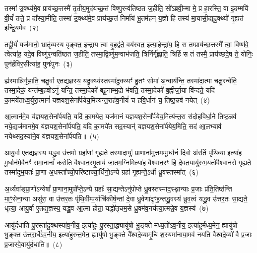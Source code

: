 तस्मा॑ उ॒क्थ्य॑मे॒व प्राय॑च्छ॒त्तस्मै॑ तृ॒तीय॒मुद॑यच्छ॒त्तं विष्णु॒रन्व॑तिष्ठत ज॒हीति॒ सो᳚\-ऽब्रवी॒न्मा मे॒ प्र हा॒रस्ति॒ वा इ॒दम्मयि॑ वी॒र्यं॑ तत्ते॒ प्र दा᳚स्या॒मीति॒ तस्मा॑ उ॒क्थ्य॑मे॒व प्राय॑च्छ॒त्तं निर्मा॑यं भू॒तम॑हन् य॒ज्ञो हि तस्य॑ मा॒यासी॒द्यदु॒क्थ्यो॑ गृ॒ह्यत॑ इन्द्रि॒यमे॒व~(२)

तद्वी॒र्यं॑ यज॑मानो॒ भ्रातृ॑व्यस्य वृङ्क्त॒ इन्द्रा॑य त्वा बृ॒हद्व॑ते॒ वय॑स्वत॒ इत्या॒हेन्द्रा॑य॒ हि स तम्प्राय॑च्छ॒त्तस्मै᳚ त्वा॒ विष्ण॑वे॒ त्वेत्या॑ह॒ यदे॒व विष्णु॑र॒न्वति॑ष्ठत ज॒हीति॒ तस्मा॒द्विष्णु॑म॒न्वाभ॑जति॒ त्रिर्निर्गृ॑ह्णाति॒ त्रिर्\mbox{}हि स तं तस्मै॒ प्राय॑च्छदे॒ष ते॒ योनिः॒ पुन॑र्\mbox{}हविर॒सीत्या॑ह॒ पुनः॑पुनः~(३)

ह्य॑स्मान्निर्गृ॒ह्णाति॒ चक्षु॒र्वा ए॒तद्य॒ज्ञस्य॒ यदु॒क्थ्य॑स्तस्मा॑दु॒क्थ्यꣳ॑ हु॒तꣳ सोमा॑ अ॒न्वाय॑न्ति॒ तस्मा॑दा॒त्मा चक्षु॒रन्वे॑ति॒ तस्मा॒देकं॒ यन्त॑म्ब॒हवो\-ऽनु॑ यन्ति॒ तस्मा॒देको॑ बहू॒नाम्भ॒द्रो भ॑वति॒ तस्मा॒देको॑ ब॒ह्वीर्जा॒या वि॑न्दते॒ यदि॑ का॒मये॑ताध्व॒र्युरा॒त्मानं॑ यज्ञयश॒सेना᳚र्पयेय॒मित्य॑न्त॒राह॑व॒नीयं॑ च हवि॒र्धानं॑ च॒ तिष्ठ॒न्नव॑ नयेत्~(४)

आ॒त्मान॑मे॒व य॑ज्ञयश॒सेना᳚र्पयति॒ यदि॑ का॒मये॑त॒ यज॑मानं यज्ञयश॒सेना᳚र्पयेय॒मित्य॑न्त॒रा स॑दोहविर्धा॒ने तिष्ठ॒न्नव॑ नये॒द्यज॑मानमे॒व य॑ज्ञयश॒सेना᳚र्पयति॒ यदि॑ का॒मये॑त सद॒स्यान्॑ यज्ञयश॒सेना᳚र्पयेय॒मिति॒ सद॑ आ॒लभ्याव॑ नयेथ्सद॒स्या॑ने॒व य॑ज्ञयश॒सेना᳚र्पयति॥~(५)

{\anuvakamend[{इती᳚न्द्रि॒यमे॒व पुनः॑पुनर्नये॒त्त्रय॑स्त्रिꣳशच्च}]}%

आयु॒र्वा ए॒तद्य॒ज्ञस्य॒ यद्ध्रु॒व उ॑त्त॒मो ग्रहा॑णां गृह्यते॒ तस्मा॒दायुः॑ प्रा॒णाना॑मुत्त॒मम्मू॒र्धानं॑ दि॒वो अ॑र॒तिं पृ॑थि॒व्या इत्या॑ह मू॒र्धान॑मे॒वैनꣳ॑ समा॒नानां᳚ करोति वैश्वान॒रमृ॒ताय॑ जा॒तम॒ग्निमित्या॑ह वैश्वान॒रꣳ हि दे॒वत॒यायु॑रुभ॒यतो॑वैश्वानरो गृह्यते॒ तस्मा॑दुभ॒यतः॑ प्रा॒णा अ॒धस्ता᳚च्चो॒परि॑ष्टाच्चा॒र्धिनो॒\-ऽन्ये ग्रहा॑ गृ॒ह्यन्ते॒\-ऽर्धी ध्रु॒वस्तस्मा᳚त्~(६)

अ॒र्ध्यवा᳚ङ्प्रा॒णो᳚\-ऽन्येषां᳚ प्रा॒णाना॒मुपो᳚प्ते॒\-ऽन्ये ग्रहाः᳚ सा॒द्यन्ते\-ऽनु॑पोप्ते ध्रु॒वस्तस्मा॑द॒स्थ्नान्याः प्र॒जाः प्र॑ति॒तिष्ठ॑न्ति मा॒ꣳ॒सेना॒न्या असु॑रा॒ वा उ॑त्तर॒तः पृ॑थि॒वीम्प॒र्याचि॑कीर्\mbox{}ष॒न्तां दे॒वा ध्रु॒वेणा॑दृꣳह॒न्तद्ध्रु॒वस्य॑ ध्रुव॒त्वं यद्ध्रु॒व उ॑त्तर॒तः सा॒द्यते॒ धृत्या॒ आयु॒र्वा ए॒तद्य॒ज्ञस्य॒ यद्ध्रु॒व आ॒त्मा होता॒ यद्धो॑तृचम॒से ध्रु॒वम॑व॒नय॑त्या॒त्मन्ने॒व य॒ज्ञस्य॑~(७)

आयु॑र्दधाति पु॒रस्ता॑दु॒क्थस्या॑व॒नीय॒ इत्या॑हुः पु॒रस्ता॒द्ध्यायु॑षो भु॒ङ्क्ते म॑ध्य॒तो॑\-ऽव॒नीय॒ इत्या॑हुर्मध्य॒मेन॒ ह्यायु॑षो भु॒ङ्क्त उ॑त्तरा॒र्धे॑\-ऽव॒नीय॒ इत्या॑हुरुत्त॒मेन॒ ह्यायु॑षो भु॒ङ्क्ते वै᳚श्वदे॒व्यामृ॒चि श॒स्यमा॑नाया॒मव॑ नयति वैश्वदे॒व्यो॑ वै प्र॒जाः प्र॒जास्वे॒वायु॑र्दधाति॥~(८)

